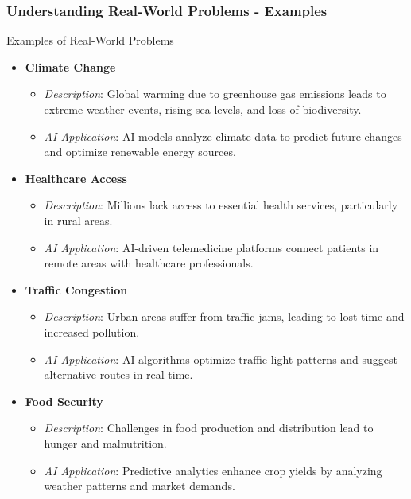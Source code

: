 \documentclass{beamer}
\begin{document}
\begin{frame}[fragile]
    \frametitle{Understanding Real-World Problems - Examples}
    \begin{block}{Examples of Real-World Problems}
        \begin{itemize}
            \item \textbf{Climate Change}
                \begin{itemize}
                    \item \textit{Description}: Global warming due to greenhouse gas emissions leads to extreme weather events, rising sea levels, and loss of biodiversity.
                    \item \textit{AI Application}: AI models analyze climate data to predict future changes and optimize renewable energy sources.
                \end{itemize}
            \item \textbf{Healthcare Access}
                \begin{itemize}
                    \item \textit{Description}: Millions lack access to essential health services, particularly in rural areas.
                    \item \textit{AI Application}: AI-driven telemedicine platforms connect patients in remote areas with healthcare professionals.
                \end{itemize}
            \item \textbf{Traffic Congestion}
                \begin{itemize}
                    \item \textit{Description}: Urban areas suffer from traffic jams, leading to lost time and increased pollution.
                    \item \textit{AI Application}: AI algorithms optimize traffic light patterns and suggest alternative routes in real-time.
                \end{itemize}
            \item \textbf{Food Security}
                \begin{itemize}
                    \item \textit{Description}: Challenges in food production and distribution lead to hunger and malnutrition.
                    \item \textit{AI Application}: Predictive analytics enhance crop yields by analyzing weather patterns and market demands.
                \end{itemize}
        \end{itemize}
    \end{block}
\end{frame}
\end{document}
